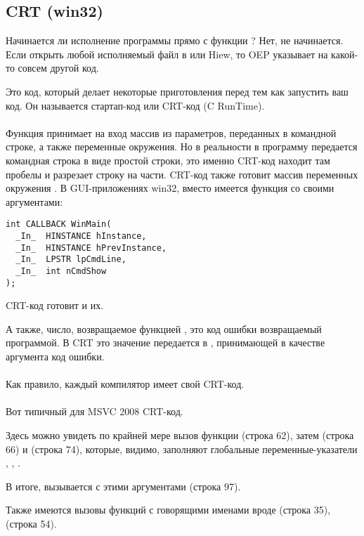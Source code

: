 \subsection{CRT (win32)}
\label{sec:CRT}

Начинается ли исполнение программы прямо с функции \main{}?
Нет, не начинается.
Если открыть любой исполняемый файл в \IDA или Hiew, 
то \ac{OEP} указывает на какой-то совсем другой код.

Это код, который делает некоторые приготовления перед тем как запустить ваш код.
Он называется стартап-код или CRT-код (C RunTime). \\
\\
Функция \main{} принимает на вход массив из параметров, переданных в командной строке, а также
переменные окружения.
Но в реальности в программу передается командная строка в виде простой строки, это именно
CRT-код находит там пробелы и разрезает строку на части.
CRT-код также готовит массив переменных окружения .
В \ac{GUI}-приложениях win32, вместо \main{} имеется функция  со своими аргументами:

\begin{lstlisting}
int CALLBACK WinMain(
  _In_  HINSTANCE hInstance,
  _In_  HINSTANCE hPrevInstance,
  _In_  LPSTR lpCmdLine,
  _In_  int nCmdShow
);
\end{lstlisting}

CRT-код готовит и их.

А также, число, возвращаемое функцией \main{}, это код ошибки возвращаемый программой.
В CRT это значение передается в , принимающей в качестве аргумента код ошибки. \\
\\
Как правило, каждый компилятор имеет свой CRT-код. \\
\\
Вот типичный для MSVC 2008 CRT-код.



Здесь можно увидеть по крайней мере вызов
функции  (строка 62), 
затем  (строка 66) и  (строка 74),
которые, видимо, заполняют глобальные переменные-указатели
, , .

В итоге, вызывается \main{} с этими аргументами (строка 97).

Также имеются вызовы функций с говорящими именами вроде  (строка 35),  (строка 54).

